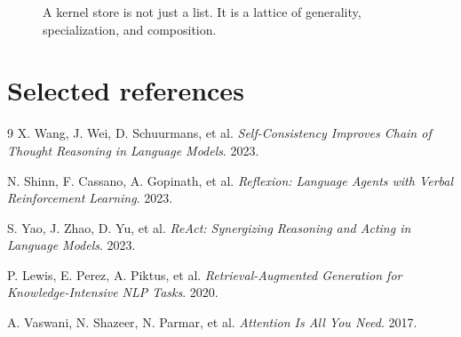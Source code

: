 \documentclass{article}
\begin{document}
\begin{figure}[t]
\centering
{}
\caption{A kernel store is not just a list. It is a lattice of generality, specialization, and composition.}
\end{figure}

\section{Selected references}
\begin{thebibliography}{9}
X. Wang, J. Wei, D. Schuurmans, et al. \emph{Self-Consistency Improves Chain of Thought Reasoning in Language Models}. 2023.

N. Shinn, F. Cassano, A. Gopinath, et al. \emph{Reflexion: Language Agents with Verbal Reinforcement Learning}. 2023.

S. Yao, J. Zhao, D. Yu, et al. \emph{ReAct: Synergizing Reasoning and Acting in Language Models}. 2023.

P. Lewis, E. Perez, A. Piktus, et al. \emph{Retrieval-Augmented Generation for Knowledge-Intensive NLP Tasks}. 2020.

A. Vaswani, N. Shazeer, N. Parmar, et al. \emph{Attention Is All You Need}. 2017.
\end{thebibliography}
\end{document}
